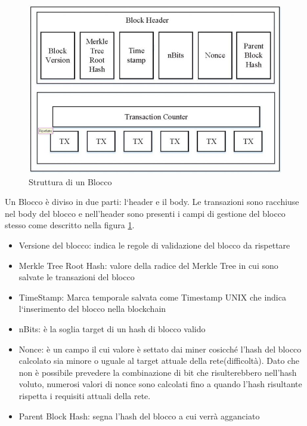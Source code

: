 \documentclass[11pt,a4paper,titlepage]{report}
\begin{document}
\begin{figure}[h]
	\includegraphics[width=\textwidth]{bcbl}
	\centering
	\caption{Struttura di un Blocco}
	\label{fig:blockblockchain1}
\end{figure}

Un Blocco è diviso in due parti: l`header e il body. Le transazioni sono racchiuse nel body del blocco e nell'header sono presenti i campi di gestione del blocco stesso come descritto nella figura \ref{fig:blockblockchain1}.

\begin{itemize}
  \item Versione del blocco: indica le regole di validazione del blocco da rispettare
  \item Merkle Tree Root Hash: valore della radice del Merkle Tree in cui sono salvate le transazioni del blocco
  \item TimeStamp: Marca temporale salvata come Timestamp UNIX che indica l`inserimento del blocco nella blockchain
  \item nBits: è la soglia target di un hash di blocco valido
  \item Nonce: è un campo il cui valore è settato dai miner cosicché l’hash del blocco calcolato sia minore o uguale al target attuale della rete(difficoltà). Dato che non è possibile prevedere la combinazione di bit che risulterebbero nell’hash voluto, numerosi valori di nonce sono calcolati fino a quando l’hash risultante rispetta i requisiti attuali della rete.
\item Parent Block Hash: segna l'hash del blocco a cui verrà agganciato
\end{itemize}
\end{document}
